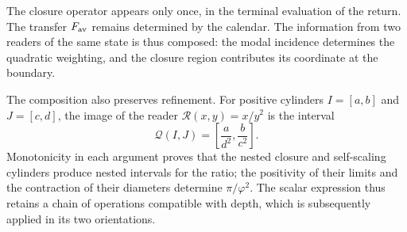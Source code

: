 The closure operator appears only once, in the terminal evaluation
of the return. The transfer \(F_{\rm av}\) remains determined by
the calendar. The information from two readers of the same state is
thus composed: the modal incidence determines the quadratic weighting,
and the closure region contributes its coordinate at the boundary.

The composition also preserves refinement. For positive cylinders
\(I=[a,b]\) and \(J=[c,d]\), the image of the reader
\(\mathcal R(x,y)=x/y^2\) is the interval
\[
 \mathcal Q(I,J)=\left[\frac{a}{d^2},\frac{b}{c^2}\right].
\]
Monotonicity in each argument proves that the nested closure and
self-scaling cylinders produce nested intervals for the ratio; the
positivity of their limits and the contraction of their diameters determine
\(\pi/\varphi^2\). The scalar expression thus retains a chain of
operations compatible with depth, which is subsequently applied in
its two orientations.
